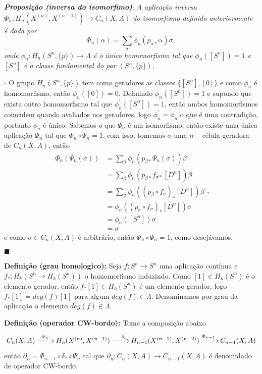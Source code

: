 \documentclass[12pt]{book}
\newcommand{\homologia}[2]{H_{#1}(#2)}
\newcommand{\homologiarel}[3]{H_{#1}(#2,#3)}
\newcommand{\homologiarelskele}[3]{H_{#1}(X^{(#2)}, X^{(#3)})}
\newcommand{\homologiarelskelesimpl}[2]{H_{#1}(X^{(#2)}, X^{(#2-1)})}
\newcommand{\definicaonomeada}[2]{\vspace{2mm} \textbf{Definição (#1):}{ #2}}
\newcommand{\tese}[3]{\vspace{2mm} \textit{\textbf{#1}}: \textit{#2} \par $\square$ #3 \par $\blacksquare$}
\begin{document}
	\tese{Proposição (inversa do isomorfimo)}{A aplicação inversa $\Phi_{n} : \homologiarelskelesimpl{n}{n} \to C_{n}(X,A)$ do isomorfismo definido anteriormente é dada por
	$$
	\Phi_{n}(\alpha) = \sum_{\sigma} \phi_{n}(p_{\sigma *}\alpha)\sigma,
	$$
	onde $\phi_{n}: \homologiarel{n}{S^{n}}{\{p\}} \to \Lambda$ é o único homomorfismo tal que $\phi_{n}([S^{n}])=1$ e $[S^{n}]$ é a classe fundamental do par $(S^{n}, \{p\})$.}{O grupo $\homologiarel{n}{S^{n}}{\{p\}}$ tem como geradores as classes $\{[S^{n}], [0]\}$ e como $\phi_{n}$ é homomorfismo, então $\phi_{n}([0]) = 0$. Definindo $\phi_{n}([S^{n}]) = 1$ e supondo que exista outro homomorfismo tal que $\phi_{n}^{'} ([S^{n}]) = 1$, então ambos homomorfismos coincidem quando avaliados nos geradores, logo $\phi_{n}^{'}=\phi_{n}$ o que é uma contradição, portanto $\phi_{n}$ é único. Sabemos o que $\Psi_{n}$ é um isomorfismo, então existe uma única aplicação $\Phi_{n}$ tal que $\Phi_{n} \circ \Psi_{n} = 1$, com isso, tomemos $\sigma$ uma $n-$célula geradora de $C_{n}(X,A)$, então
	$$
	\begin{aligned}
	\Phi_{n}(\Psi_{n}(\sigma)) 
	&= \sum_{\beta}\phi_{n}(p_{\beta *}\Psi_{n}(\sigma))\beta
	\\
	&= \sum_{\beta}\phi_{n}(p_{\beta *}f_{\sigma *}[D^{n}])\beta
	\\
	&= \sum_{\beta}\phi_{n}((p_{\beta}\circ f_{\sigma})_{*}[D^{n}])\beta
	\\
	&= \phi_{n}((p_{\sigma}\circ f_{\sigma})_{*}[D^{n}])\sigma
	\\
	&= \phi_{n}([S^{n}])\sigma
	\\
	&= \sigma	
	\end{aligned},
	$$
	e como $\sigma \in C_{n}(X,A)$ é arbitrário, então $\Phi_{n} \circ \Psi_{n} = 1$, como desejávamos.
	}
	
	\definicaonomeada{grau homologico}{Seja $f: S^{n} \to S^{n}$ uma aplicação contínua e $f_{*}: \homologia{k}{S^{n} \to \homologia{k}{S^{n}}}$ o homomorfismo induzindo. Como $[1] \in \homologia{k}{S^{n}}$ é o elemento gerador, então $f_{*}[1] \in \homologia{k}{S^{n}}$ é um elemento gerador, logo $f_{*}[1] = deg(f)[1]$ para algum $deg(f) \in \Lambda$. Denominamos por grau da aplicação o elemento $deg(f) \in \Lambda$.}
	
	\definicaonomeada{operador CW-bordo}{Tome a composição abaixo
	\[
	\xymatrix{
		C_{n}(X,A) \ar[r]^{\Psi_{n}\qquad} &
		\homologiarelskelesimpl{n}{n} \ar[r]^{\delta_{*}} & 
		\homologiarelskele{n-1}{n-1}{n-2} \ar[r]^{\qquad \Phi_{n-1}}&
		C_{n-1}(X,A)
		}
	\]
	então $\partial_{n} = \Phi_{n-1} \circ \delta_{*} \circ \Psi_{n}$ tal que $\partial_{n}: C_{n}(X,A) \to C_{n-1}(X,A)$ é denomidado de operador CW-bordo.}
\end{document}
